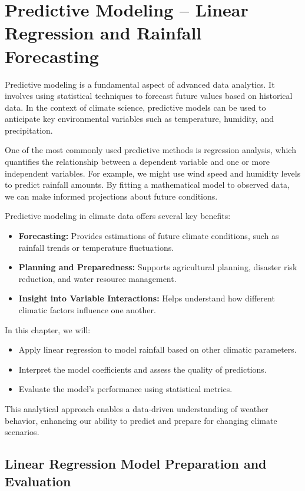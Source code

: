 \section{Predictive Modeling – Linear Regression and Rainfall Forecasting}

Predictive modeling is a fundamental aspect of advanced data analytics. It involves using statistical techniques to forecast future values based on historical data. In the context of climate science, predictive models can be used to anticipate key environmental variables such as temperature, humidity, and precipitation.

One of the most commonly used predictive methods is regression analysis, which quantifies the relationship between a dependent variable and one or more independent variables. For example, we might use wind speed and humidity levels to predict rainfall amounts. By fitting a mathematical model to observed data, we can make informed projections about future conditions.

Predictive modeling in climate data offers several key benefits:
\begin{itemize}
  \item \textbf{Forecasting:} Provides estimations of future climate conditions, such as rainfall trends or temperature fluctuations.
  \item \textbf{Planning and Preparedness:} Supports agricultural planning, disaster risk reduction, and water resource management.
  \item \textbf{Insight into Variable Interactions:} Helps understand how different climatic factors influence one another.
\end{itemize}

In this chapter, we will:
\begin{itemize}
  \item Apply linear regression to model rainfall based on other climatic parameters.
  \item Interpret the model coefficients and assess the quality of predictions.
  \item Evaluate the model’s performance using statistical metrics.
\end{itemize}

This analytical approach enables a data-driven understanding of weather behavior, enhancing our ability to predict and prepare for changing climate scenarios.

\subsection*{Linear Regression Model Preparation and Evaluation}

